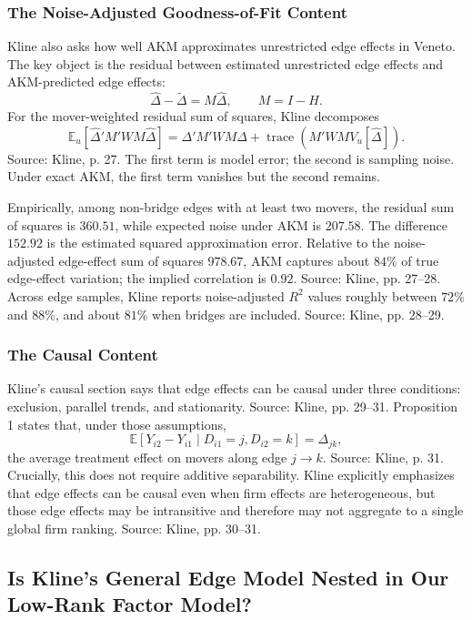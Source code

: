 ﻿\documentclass[11pt]{article}
\newcommand{\E}{\mathbb{E}}
\newcommand{\1}{\mathbf{1}}
\begin{document}
\subsubsection{The Noise-Adjusted Goodness-of-Fit Content}

Kline also asks how well AKM approximates unrestricted edge effects in Veneto.
The key object is the residual between estimated unrestricted edge effects and
AKM-predicted edge effects:
\[
\hat\Delta-\tilde\Delta=M\hat\Delta,
\qquad M=I-H.
\]
For the mover-weighted residual sum of squares, Kline decomposes
\[
\E_u[\hat\Delta'M'WM\hat\Delta]
=
\Delta'M'WM\Delta
+\operatorname{trace}\!\left(M'WMV_u[\hat\Delta]\right).
\]
Source: Kline, p. 27. The first term is model error; the second is sampling noise.
Under exact AKM, the first term vanishes but the second remains.

Empirically, among non-bridge edges with at least two movers, the residual sum of
squares is $360.51$, while expected noise under AKM is $207.58$. The difference
$152.92$ is the estimated squared approximation error. Relative to the
noise-adjusted edge-effect sum of squares $978.67$, AKM captures about $84\%$ of
true edge-effect variation; the implied correlation is $0.92$. Source: Kline,
pp. 27--28. Across edge samples, Kline reports noise-adjusted $R^2$ values roughly
between $72\%$ and $88\%$, and about $81\%$ when bridges are included. Source:
Kline, pp. 28--29.

\subsubsection{The Causal Content}

Kline's causal section says that edge effects can be causal under three conditions:
exclusion, parallel trends, and stationarity. Source: Kline, pp. 29--31. Proposition
1 states that, under those assumptions,
\[
\E[Y_{i2}-Y_{i1}\mid D_{i1}=j,D_{i2}=k]=\Delta_{jk},
\]
the average treatment effect on movers along edge $j\to k$. Source: Kline, p. 31.
Crucially, this does not require additive separability. Kline explicitly emphasizes
that edge effects can be causal even when firm effects are heterogeneous, but those
edge effects may be intransitive and therefore may not aggregate to a single global
firm ranking. Source: Kline, pp. 30--31.

\subsection{Is Kline's General Edge Model Nested in Our Low-Rank Factor Model?}
\end{document}
